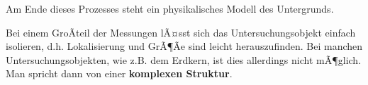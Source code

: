 Am Ende dieses Prozesses steht ein physikalisches Modell des Untergrunds. 

Bei einem GroÃteil der Messungen lÃ¤sst sich das Untersuchungsobjekt einfach isolieren, d.h. Lokalisierung und GrÃ¶Ãe sind leicht herauszufinden. Bei manchen Untersuchungsobjekten, wie z.B. dem Erdkern, ist dies allerdings nicht mÃ¶glich. Man spricht dann von einer \textbf{komplexen Struktur}.   

